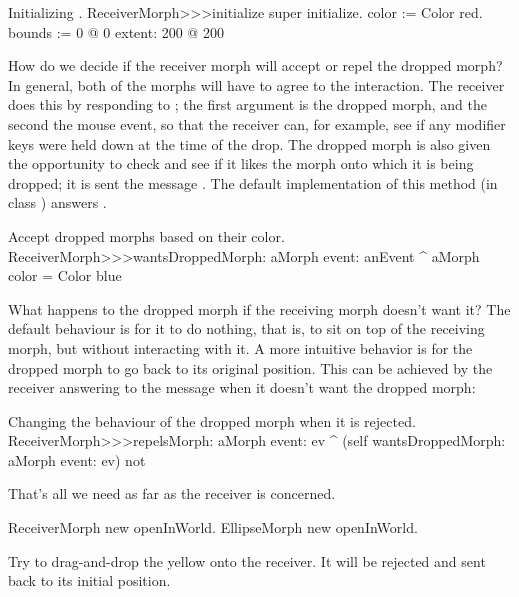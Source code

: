 \documentclass[a4paper,10pt,twoside]{book}
\begin{document}
\begin{method}{Initializing .}
ReceiverMorph>>>initialize
	super initialize.
	color := Color red.
	bounds := 0 @ 0 extent: 200 @ 200
\end{method}

How do we decide if the receiver morph will accept or repel the dropped morph?
In general, both of the morphs will have to agree to the interaction.
The receiver does this by responding to ; the first argument is the dropped morph, and the second the mouse event, so that the receiver can, for example, see if any modifier keys were held down at the time of the drop. 
The dropped morph is also given the opportunity to check and see if it likes the morph onto which it is being dropped; it is sent the message .  The default implementation of  this method (in class ) answers .

\begin{method}{Accept dropped morphs based on their color.}
ReceiverMorph>>>wantsDroppedMorph: aMorph event: anEvent
	^ aMorph color = Color blue
\end{method}

What happens to the dropped morph if the receiving morph doesn't want it?  The default behaviour is for it to do nothing, that is, to sit on top of the receiving morph, but without interacting with it.  A more intuitive behavior is for the dropped morph to go back to its original position.  This can be achieved by the receiver answering  to the message  when it doesn't want the dropped morph:

\begin{method}{Changing the behaviour of the dropped morph when it is rejected.}
ReceiverMorph>>>repelsMorph: aMorph event: ev
	^ (self wantsDroppedMorph: aMorph event: ev) not
\end{method}

That's all we need as far as the receiver is concerned.

\begin{code}{}
ReceiverMorph new openInWorld.
EllipseMorph new openInWorld.
\end{code}
\noindent
Try to drag-and-drop the yellow  onto the receiver. It will be rejected and sent back to its initial position.
\end{document}
